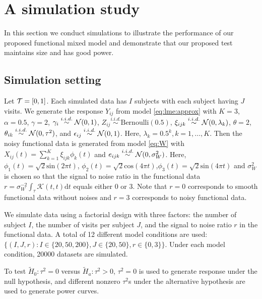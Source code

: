 \section{A simulation study}
In this section we conduct simulations to  illustrate the performance of our proposed functional mixed model and demonstrate that our proposed test maintains size and has good power.


\subsection{Simulation setting}
Let $\mathcal{T}=[0,1]$. Each simulated data has $I$ subjects with each subject having $J$ visits.
We generate the response $Y_{ij}$
from model \eqref{eq:lme:approx} with $K=3$, $\alpha = 0.5$,
 $\gamma = 2$,
 $\gamma_i \overset{i.i.d.}{\sim} \mathcal{N}(0, 1)$,
 $Z_{ij} \overset{i.i.d.}{\sim} \text{Bernoulli}(0.5)$,
  $\xi_{ijk} \overset{i.i.d.}{\sim} \mathcal{N}(0,\lambda_k)$,
  $\theta = 2$, $\theta_{ik} \overset{i.i.d.}{\sim} \mathcal{N}(0, \tau^2)$,
  and  $\epsilon_{ij} \overset{i.i.d.}{\sim} \mathcal{N}(0, 1)$.
  Here, $\lambda_k=0.5^k, k=1,\dots, K$.
 Then the noisy functional data is generated from model \eqref{eq:W}
with $X_{ij}(t) = \sum_{k=1}^K \xi_{ijk} \phi_k(t)$ 
and $e_{ijk}\overset{i.i.d.}{\sim}\mathcal{N}(0,\sigma_W^2)$.
Here, $\phi_1 (t)=\sqrt{2}\mathrm{sin}(2\pi t)$, $\phi_2 (t)=\sqrt{2}\mathrm{cos}(4\pi t)$,$\phi_3 (t)=\sqrt{2}\mathrm{sin}(4\pi t)$ and  $\sigma_W^2$ is chosen so 
that the signal to noise ratio in the functional data $r = \sigma_W^{-2}\int_{\tau} \mathcal{K}(t,t) \mathrm{d}t$
equals either 0 or 3. Note that $r=0$ corresponds to smooth functional data without noises and 
$r=3$ corresponds to noisy functional data. 

We simulate data using a factorial design with three factors: the number of subject $I$, the number of visits per subject $J$, and the signal to noise ratio $r$ in the functional data. A total of 12 different model conditions
are used: $\{(I,J, r):I\in\{ 20,50,200\}, J\in \{20,50\}, r\in\{0,3\} \}$.
Under each model condition, 20000 datasets are simulated.

 To test $\tilde{H}_0: \tau^2=0$ versus $\tilde{H}_a: \tau^2>0$,  $\tau^2=0$ is used to generate response under the null hypothesis, and different nonzero $\tau^2$s under the alternative hypothesis are used to generate  power curves. %

